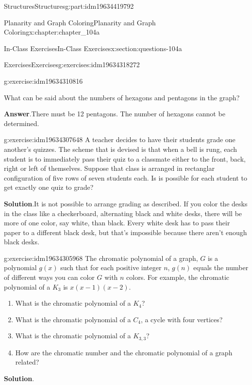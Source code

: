 \documentclass[oneside,10pt,]{book}
\newcommand{\blocktitlefont}{\relax}
\numberwithin{equation}{section}
\begin{document}
\begin{partptx}{Structures}{}{Structures}{}{}{g:part:idm19634419792}
\begin{chapterptx}{Planarity and Graph Coloring}{}{Planarity and Graph Coloring}{}{}{x:chapter:chapter_104a}
\begin{sectionptx}{In-Class Exercises}{}{In-Class Exercises}{}{}{x:section:questions-104a}
\begin{exercises-subsection-numberless}{Exercises}{}{Exercises}{}{}{g:exercises:idm19634318272}
\begin{exercisegroup}
\begin{divisionexerciseeg}{3}{}{}{g:exercise:idm19634310816}
\begin{itemize}[label=\textbullet]
\end{itemize}
What can be said about the numbers of hexagons and pentagons in the graph?%
\par\smallskip%
\noindent\textbf{\blocktitlefont Answer}.\hypertarget{g:answer:idm19634308032}{}\quad{}There must be 12 pentagons. The number of hexagons cannot be determined.%
\end{divisionexerciseeg}%
\begin{divisionexerciseeg}{4}{}{}{g:exercise:idm19634307648}%
A teacher decides to have their students grade one another's quizzes.  The scheme that is devised is that when a bell is rung, each  student is to immediately pass their quiz to a classmate either to the front, back, right or left of themselves.  Suppose that class is arranged in rectanglar configuration of five rows of seven students each. Is is possible for each student to get exactly one quiz to grade?%
\par\smallskip%
\noindent\textbf{\blocktitlefont Solution}.\hypertarget{g:solution:idm19634307520}{}\quad{}It is not possible to arrange grading as described.  If you color the desks in the class like a checkerboard, alternating black and white desks, there will be more of one color, say white, than black. Every white desk has to pass their paper to a different black desk, but that's impossible because there aren't enough black desks.%
\end{divisionexerciseeg}%
\begin{divisionexerciseeg}{5}{}{}{g:exercise:idm19634305968}%
%
The chromatic polynomial of a graph, \(G\) is a polynomial \(g(x)\) such that for each positive integer \(n\), \(g(n)\) equals the number of different ways you can color \(G\) with \(n\) colors.  For example, the chromatic polynomial of a \(K_3\) is \(x(x-1)(x-2)\).%
\begin{enumerate}[label=(\alph*)]
\item{}What is the chromatic polynomial of a \(K_4\)?%
\item{}What is the chromatic polynomial of a \(C_4\), a cycle with four vertices?%
\item{}What is the chromatic polynomial of a \(K_{3,3}\)?%
\item{}How are the chromatic number and the chromatic polynomial of a graph related?%
\end{enumerate}
%
\par\smallskip%
\noindent\textbf{\blocktitlefont Solution}.\hypertarget{g:solution:idm19634305168}{}\quad{}%

\end{divisionexerciseeg}
\end{exercisegroup}
\end{exercises-subsection-numberless}
\end{sectionptx}
\end{chapterptx}
\end{partptx}
\end{document}
